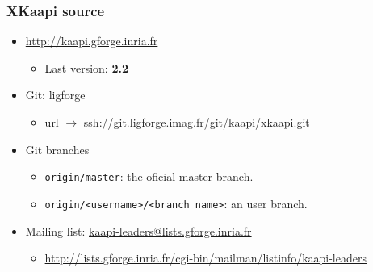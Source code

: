 \begin{frame}[fragile]
  \frametitle{XKaapi source}
  \begin{itemize}
  \item \url{http://kaapi.gforge.inria.fr}
    \begin{itemize}
    \item Last version: \textbf{2.2}
    \end{itemize}
  \item Git: ligforge
    \begin{itemize}
    \item url $\rightarrow$ \url{ssh://git.ligforge.imag.fr/git/kaapi/xkaapi.git}
    \end{itemize}
  \item Git branches
    \begin{itemize}
    \item \verb+origin/master+: the oficial master branch.
    \item \verb+origin/<username>/<branch name>+: an user branch. 
    \end{itemize}
  \item Mailing list: \url{kaapi-leaders@lists.gforge.inria.fr}
    \begin{itemize}
    \item \url{http://lists.gforge.inria.fr/cgi-bin/mailman/listinfo/kaapi-leaders}
    \end{itemize}
  \end{itemize}
\end{frame}
